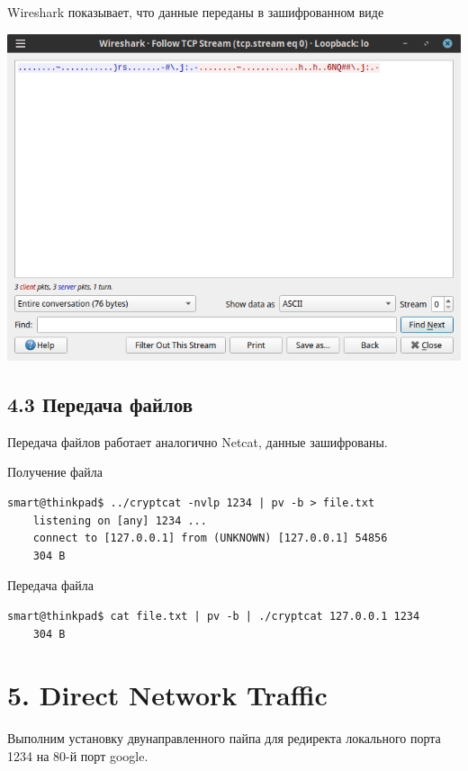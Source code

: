 Wireshark показывает, что данные переданы в зашифрованном виде
\begin{center}
    \includegraphics[scale=0.55]{res/7.wireshark-cryptcat-follow.png}
\end{center}

\subsection*{4.3 Передача файлов}

Передача файлов работает аналогично Netcat, данные зашифрованы.

Получение файла
\begin{Verbatim}[frame=single,breaklines=true,breakanywhere=true]
    smart@thinkpad$ ../cryptcat -nvlp 1234 | pv -b > file.txt
    listening on [any] 1234 ...
    connect to [127.0.0.1] from (UNKNOWN) [127.0.0.1] 54856
    304 B
\end{Verbatim}

Передача файла
\begin{Verbatim}[frame=single,breaklines=true,breakanywhere=true]
    smart@thinkpad$ cat file.txt | pv -b | ./cryptcat 127.0.0.1 1234
    304 B
\end{Verbatim}

\section*{5. Direct Network Traffic}

Выполним установку двунаправленного пайпа для редиректа локального порта 1234 на 80-й порт google.

